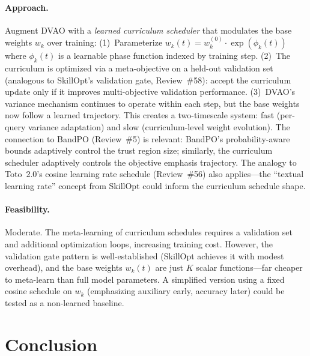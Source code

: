 \documentclass[11pt,a4paper]{article}
\begin{document}
\paragraph{Approach.}
Augment DVAO with a \emph{learned curriculum scheduler} that modulates the base weights $w_k$ over training: (1)~Parameterize $w_k(t) = w_k^{(0)} \cdot \exp(\phi_k(t))$ where $\phi_k(t)$ is a learnable phase function indexed by training step. (2)~The curriculum is optimized via a meta-objective on a held-out validation set (analogous to SkillOpt's validation gate, Review~\#58): accept the curriculum update only if it improves multi-objective validation performance. (3)~DVAO's variance mechanism continues to operate within each step, but the base weights now follow a learned trajectory. This creates a two-timescale system: fast (per-query variance adaptation) and slow (curriculum-level weight evolution). The connection to BandPO (Review~\#5) is relevant: BandPO's probability-aware bounds adaptively control the trust region size; similarly, the curriculum scheduler adaptively controls the objective emphasis trajectory. The analogy to Toto~2.0's cosine learning rate schedule (Review~\#56) also applies---the ``textual learning rate'' concept from SkillOpt could inform the curriculum schedule shape.

\paragraph{Feasibility.}
Moderate. The meta-learning of curriculum schedules requires a validation set and additional optimization loops, increasing training cost. However, the validation gate pattern is well-established (SkillOpt achieves it with modest overhead), and the base weights $w_k(t)$ are just $K$ scalar functions---far cheaper to meta-learn than full model parameters. A simplified version using a fixed cosine schedule on $w_k$ (emphasizing auxiliary early, accuracy later) could be tested as a non-learned baseline.

\section*{Conclusion}
\end{document}
